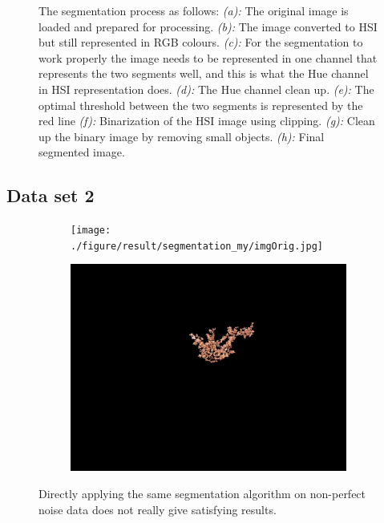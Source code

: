 \begin{figure}[H]
\begin{subfigure}[b]{0.3\textwidth}
		\caption{}
		\label{fig:seg_h}
    \end{subfigure}
    \caption{The segmentation process as follows: \textit{(a):} The original image is loaded and prepared for processing. \textit{(b):} The image converted to HSI but still represented in RGB colours. \textit{(c):} For the segmentation to work properly the image needs to be represented in one channel that represents the two segments well, and this is what the Hue channel in HSI representation does. \textit{(d):} The Hue channel clean up. \textit{(e):} The optimal threshold between the two segments is represented by the red line  \textit{(f):} Binarization of the HSI image using clipping. \textit{(g):} Clean up the binary image by removing small objects. \textit{(h):} Final segmented image.  }
    \label{fig:1}
\end{figure}

\subsection{Data set 2}

\begin{figure}[H]
    \centering
    \captionsetup[subfigure]{justification=centering}
    \begin{subfigure}[b]{0.47\textwidth}
        \centering
        \texttt{[image: ./figure/result/segmentation\_my/imgOrig.jpg]}
		\caption{}
		\label{fig:seg_a}
    \end{subfigure}
    \begin{subfigure}[b]{0.47\textwidth}
        \centering
        \includegraphics[width=\textwidth]{./figure/result/segmentation_my/imgSeg.png}
        \caption{}
		\label{fig:seg_b}
    \end{subfigure}
    \caption{Directly applying the same segmentation algorithm on non-perfect noise data does not really give satisfying results.}
    \label{fig:result_segmentation_2}
\end{figure}


